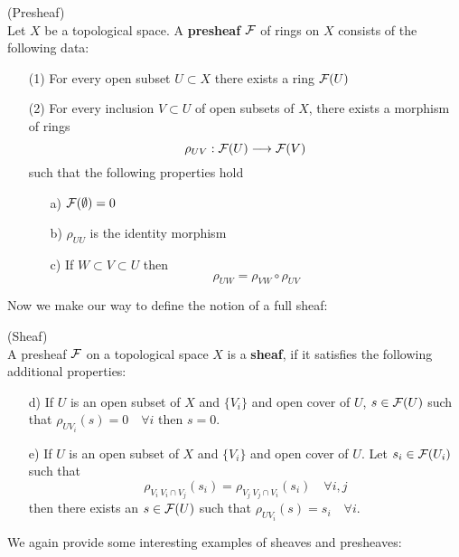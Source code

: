 \begin{definition} (Presheaf)\\
  Let $X$ be a topological space. A \textbf{presheaf} ${\mathcal{F}}$ of rings on $X$ consists of the following data:
  \begin{itemize}
    \item[(1)] For every open subset $U\subset X$ there exists a ring ${\mathcal{F}}(U)$

    \item[(2)] For every inclusion $V \subset U$ of open subsets of $X$, there exists a morphism of rings
    $$ \rho_{UV} : {\mathcal{F}}(U) \longrightarrow {\mathcal{F}}(V) $$
    such that the following properties hold
    \begin{itemize}
      \item[a)] ${\mathcal{F}}(\emptyset) = 0$

      \item[b)] $\rho_{UU}$ is the identity morphism

      \item[c)] If $W\subset V \subset U$ then
      $$ \rho_{UW} = \rho_{VW} \circ \rho_{UV} $$

    \end{itemize}
  \end{itemize}
\end{definition}

Now we make our way to define the notion of a full sheaf:

\begin{definition} (Sheaf)\\
  A presheaf ${\mathcal{F}}$ on a topological space $X$ is a \textbf{sheaf}, if it satisfies the following additional properties:
  \begin{itemize}
    \item[d)] If $U$ is an open subset of $X$ and $\{V_i\}$ and open cover of $U$, $s\in{\mathcal{F}}(U)$ such that $\rho_{UV_i}(s) = 0 \quad \forall i$ then $s=0$.

    \item[e)] If $U$ is an open subset of $X$ and $\{V_i\}$ and open cover of $U$. Let $s_i \in {\mathcal{F}}(U_i)$ such that
    $$ \rho_{V_i \ V_i \cap V_j} (s_i) = \rho_{V_j \ V_j \cap V_i} (s_i) \quad \forall i,j$$
    then there exists an $s\in{\mathcal{F}}(U)$ such that $\rho_{U V_i} (s) = s_i \quad \forall i$.
  \end{itemize}
\end{definition}

We again provide some interesting examples of sheaves and presheaves:

